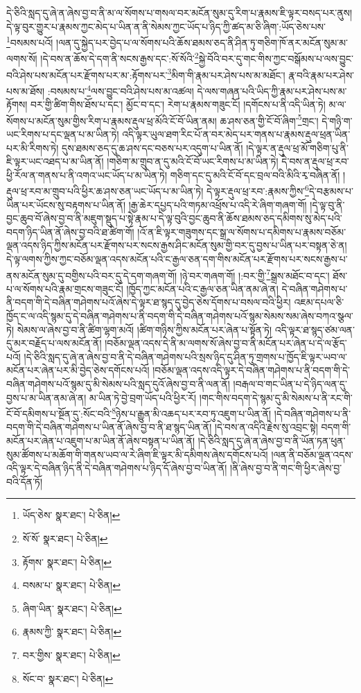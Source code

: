 དེ་ཅིའི་སླད་དུ་ཞེ་ན་ཞེས་བྱ་བ་ནི་མ་ལ་སོགས་པ་གསལ་བར་མངོན་སུམ་དུ་རིག་པ་རྣམས་ཇི་ལྟར་བསད་པར་ནུས། དེ་ལྟ་བུར་གྱུར་པ་རྣམས་ཀྱང་མེད་པ་ཡིན་ན་ནི་སེམས་ཀྱང་ཡོད་པ་ཉིད་ཀྱི་ཚད་མ་ཅི་ཞིག་:ཡོད་ཅེས་པས་\footnote{ཡོད་ཅེས་  སྣར་ཐང་།  པེ་ཅིན། }བསམས་པའོ། །ལན་དུ་སྐྱེད་པར་བྱེད་པ་ལ་སོགས་པའི་ཆོས་ཐམས་ཅད་ནི་ཤིན་ཏུ་གཅིག་ཁོ་ནར་མངོན་སུམ་མ་ལགས་སོ། །དེ་བས་ན་ཆོས་དེ་དག་ནི་སངས་རྒྱས་དང་:སོ་སོའི་\footnote{སོ་སོ་  སྣར་ཐང་།  པེ་ཅིན། }སྐྱེ་བོའི་བར་དུ་གང་གིས་ཀྱང་བསྒོམས་པ་ལས་བྱུང་བའི་ཤེས་པས་མངོན་པར་རྫོགས་པར་མ་:རྟོགས་པར་\footnote{རྟོགས་  སྣར་ཐང་།  པེ་ཅིན། }མིག་གི་རྣམ་པར་ཤེས་པས་མ་མཐོང་། རྣ་བའི་རྣམ་པར་ཤེས་པས་མ་ཐོས། :བསམས་པ་\footnote{བསམ་པ་  སྣར་ཐང་།  པེ་ཅིན། }ལས་བྱུང་བའི་ཤེས་པས་མ་འཚལ། དེ་ལས་གཞན་པའི་ཡིད་ཀྱི་རྣམ་པར་ཤེས་པས་མ་རྟོགས། བར་གྱི་ཚིག་གིས་ཐོས་པ་དང་། མྱོང་བ་དང་། རེག་པ་རྣམས་གཟུང་ངོ། །དགོངས་པ་ནི་འདི་ཡིན་ཏེ། མ་ལ་སོགས་པ་མངོན་སུམ་གྱིས་རིག་པ་རྣམས་རྡུལ་ཕྲ་མོའི་ངོ་བོ་ཡིན་ནམ། ཆ་ཤས་ཅན་གྱི་ངོ་བོ་ཞིག་\footnote{ཞིག་ཡིན་  སྣར་ཐང་།  པེ་ཅིན། }གྲང་། དེ་གཉི་ག་ཡང་རིགས་པ་དང་ལྡན་པ་མ་ཡིན་ཏེ། འདི་ལྟར་ཡུལ་ཐག་རིང་པོ་ན་བར་མེད་པར་གནས་པ་རྣམས་རྡུལ་ཕྲན་ཡིན་པར་མི་རིགས་ཏེ། དུས་ཐམས་ཅད་དུ་ཆ་ཤས་དང་བཅས་པར་འདུག་པ་ཡིན་ནོ། །དེ་ལྟར་ན་རྡུལ་ཕྲ་མོ་གཅིག་པུ་ནི་ཇི་ལྟར་ཡང་འཐད་པ་མ་ཡིན་ནོ། །གཅིག་མ་གྲུབ་ན་དུ་མའི་ངོ་བོ་ཡང་རིགས་པ་མ་ཡིན་ཏེ། དེ་བས་ན་རྡུལ་ཕྲ་རབ་ཕྱི་རོལ་ན་གནས་པ་ནི་འགའ་ཡང་ཡོད་པ་མ་ཡིན་ཏེ། གཅིག་དང་དུ་མའི་ངོ་བོ་དང་བྲལ་བའི་མིའི་རྭ་བཞིན་ནོ། །རྡུལ་ཕྲ་རབ་མ་གྲུབ་པའི་ཕྱིར་ཆ་ཤས་ཅན་ཡང་ཡོད་པ་མ་ཡིན་ཏེ། དེ་ལྟར་རྡུལ་ཕྲ་རབ་:རྣམས་ཀྱིས་\footnote{རྣམས་ཀྱི་  སྣར་ཐང་།  པེ་ཅིན། }དེ་བརྩམས་པ་ཡིན་པར་ཡོངས་སུ་བརྟགས་པ་ཡིན་ནོ། །རྒྱ་ཆེར་དཔྱད་པའི་གཏམ་འཕྲོས་པ་འདི་རེ་ཞིག་གཞག་གོ། །དེ་ལྟ་བུ་ནི་བྱང་ཆུབ་བོ་ཞེས་བྱ་བ་ནི་མཇུག་སྡུད་པ་སྟེ་རྣམ་པ་དེ་ལྟ་བུའི་བྱང་ཆུབ་ནི་ཆོས་ཐམས་ཅད་དམིགས་སུ་མེད་པའི་བདག་ཉིད་ཡིན་ནོ་ཞེས་བྱ་བའི་ཐ་ཚིག་གོ། །འོ་ན་ཇི་ལྟར་གཟུགས་དང་སྒྲ་ལ་སོགས་པ་དམིགས་པ་རྣམས་བཅོམ་ལྡན་འདས་ཉིད་ཀྱིས་མངོན་པར་རྫོགས་པར་སངས་རྒྱས་ཤིང་མངོན་སུམ་གྱི་བར་དུ་བྱས་པ་ཡིན་པར་བསྟན་ཅེ་ན། དེ་ལྟ་ལགས་ཀྱིས་ཀྱང་བཅོམ་ལྡན་འདས་མངོན་པའི་ང་རྒྱལ་ཅན་དག་གིས་མངོན་པར་རྫོགས་པར་སངས་རྒྱས་པ་ནས་མངོན་སུམ་དུ་བགྱིས་པའི་བར་དུ་དེ་དག་གཞག་གོ། །ཉེ་བར་གཞག་གོ། །:བར་གྱི་\footnote{བར་གྱིས་  སྣར་ཐང་།  པེ་ཅིན། }སྒྲས་མཐོང་བ་དང་། ཐོས་པ་ལ་སོགས་པའི་རྣམ་གྲངས་གཟུང་ངོ། །ཁྱོད་ཀྱང་མངོན་པའི་ང་རྒྱལ་ཅན་ཡིན་ནམ་ཞེ་ན། དེ་བཞིན་གཤེགས་པ་ནི་བདག་གི་དེ་བཞིན་གཤེགས་པའོ་ཞེས་དེ་ལྟར་ཐ་སྙད་དུ་བྱེད་ཅེས་དོགས་པ་བསལ་བའི་ཕྱིར། འཇམ་དཔལ་ཅི་ཁྱོད་ང་ལ་འདི་སྙམ་དུ་དེ་བཞིན་གཤེགས་པ་ནི་བདག་གི་དེ་བཞིན་གཤེགས་པའོ་སྙམ་སེམས་སམ་ཞེས་བཀའ་སྩལ་ཏེ། སེམས་ལ་ཞེས་བྱ་བ་ནི་ཚིག་ལྷག་མའོ། །ཚིག་གཉིས་ཀྱིས་མངོན་པར་ཞེན་པ་སྟོན་ཏེ། འདི་ལྟར་ཐ་སྙད་ཙམ་ལན་དུ་མར་བརྗོད་པ་ལས་མངོན་ནོ། །བཅོམ་ལྡན་འདས་དེ་ནི་མ་ལགས་སོ་ཞེས་བྱ་བ་ནི་མངོན་པར་ཞེན་པ་དེ་ལ་རྩོད་པའོ། །དེ་ཅིའི་སླད་དུ་ཞེ་ན་ཞེས་བྱ་བ་ནི་དེ་བཞིན་གཤེགས་པའི་སྲས་ཉིད་དུ་ཤིན་ཏུ་གྲགས་པ་ཁྱོད་ཇི་ལྟར་ཡབ་ལ་མངོན་པར་ཞེན་པར་མི་བྱེད་ཅེས་དགོངས་པའོ། །བཅོམ་ལྡན་འདས་འདི་ལྟར་དེ་བཞིན་གཤེགས་པ་ནི་བདག་གི་དེ་བཞིན་གཤེགས་པའོ་སྙམ་དུ་མི་སེམས་པའི་སླད་དུའོ་ཞེས་བྱ་བ་ནི་ལན་ནོ། །བརྒལ་བ་གང་ཡིན་པ་དེ་ཉིད་ལན་དུ་བྱས་པ་མ་ཡིན་ནམ་ཞེ་ན། མ་ཡིན་ཏེ་བྱེ་བྲག་ཡོད་པའི་ཕྱིར་རོ། །གང་གིས་བདག་དེ་སྙམ་དུ་མི་སེམས་པ་ནི་རང་གི་ངོ་བོ་དམིགས་པ་སྔོན་དུ་:སོང་བའི་\footnote{སོང་བ་  སྣར་ཐང་།  པེ་ཅིན། }ཉེས་པ་རྒྱུན་མི་འཆད་པར་རབ་ཏུ་འཇུག་པ་ཡིན་ནོ། །དེ་བཞིན་གཤེགས་པ་ནི་བདག་གི་དེ་བཞིན་གཤེགས་པ་ཡིན་ནོ་ཞེས་བྱ་བ་ནི་ཐ་སྙད་ཡིན་ནོ། །དེ་བས་ན་འདིའི་རྗེས་སུ་འབྲང་སྟེ། བདག་གི་མངོན་པར་ཞེན་པ་འཇུག་པ་མ་ཡིན་ནོ་ཞེས་བསྟན་པ་ཡིན་ནོ། །དེ་ཅིའི་སླད་དུ་ཞེ་ན་ཞེས་བྱ་བ་ནི་ཡོན་ཏན་ཕུན་སུམ་ཚོགས་པ་མཆོག་གི་གནས་ཡབ་ལ་རེ་ཞིག་ཇི་ལྟར་མི་དམིགས་ཞེས་དགོངས་པའོ། །ལན་ནི་བཅོམ་ལྡན་འདས་འདི་ལྟར་དེ་བཞིན་ཉིད་ནི་དེ་བཞིན་གཤེགས་པ་ཉིད་དོ་ཞེས་བྱ་བ་ཡིན་ནོ། །ནི་ཞེས་བྱ་བ་ནི་གང་གི་ཕྱིར་ཞེས་བྱ་བའི་དོན་ཏོ། 